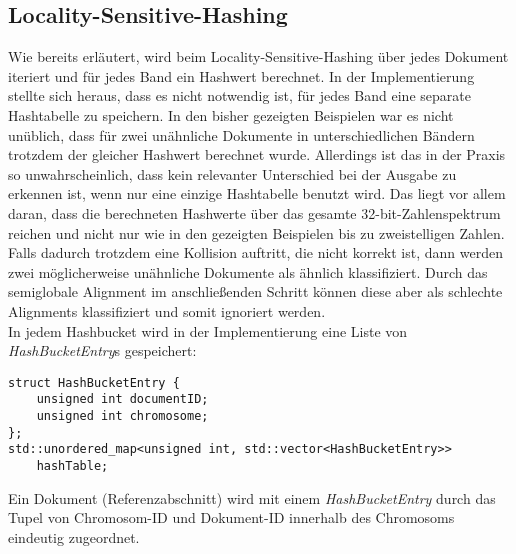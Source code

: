\subsection{Locality-Sensitive-Hashing}
Wie bereits erläutert, wird beim Locality-Sensitive-Hashing über jedes Dokument iteriert und für jedes Band ein Hashwert berechnet.
In der Implementierung stellte sich heraus, dass es nicht notwendig ist, für jedes Band eine separate Hashtabelle zu speichern.
In den bisher gezeigten Beispielen war es nicht unüblich, dass für zwei unähnliche Dokumente in unterschiedlichen Bändern trotzdem der gleicher Hashwert berechnet wurde.
Allerdings ist das in der Praxis so unwahrscheinlich, dass kein relevanter Unterschied bei der Ausgabe zu erkennen ist, wenn nur eine einzige Hashtabelle benutzt wird.
Das liegt vor allem daran, dass die berechneten Hashwerte über das gesamte 32-bit-Zahlenspektrum reichen und nicht nur wie in den gezeigten Beispielen bis zu zweistelligen Zahlen.
Falls dadurch trotzdem eine Kollision auftritt, die nicht korrekt ist, dann werden zwei möglicherweise unähnliche Dokumente als ähnlich klassifiziert.
Durch das semiglobale Alignment im anschließenden Schritt können diese aber als schlechte Alignments klassifiziert und somit ignoriert werden. \\
In jedem Hashbucket wird in der Implementierung eine Liste von \textit{HashBucketEntry}s gespeichert:
\begin{lstlisting}
struct HashBucketEntry {
    unsigned int documentID;
    unsigned int chromosome;
};
std::unordered_map<unsigned int, std::vector<HashBucketEntry>>
	hashTable;	
\end{lstlisting}
Ein Dokument (Referenzabschnitt) wird mit einem \textit{HashBucketEntry} durch das Tupel von Chromosom-ID und Dokument-ID innerhalb des Chromosoms eindeutig zugeordnet.
